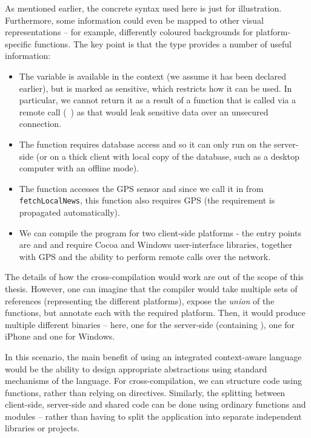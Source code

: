 As mentioned earlier, the concrete syntax used here is just for illustration. Furthermore,
some information could even be mapped to other visual representations -- for example, differently
coloured backgrounds for platform-specific functions. The key point is that the type provides a
number of useful information:

\begin{itemize}
\item The  variable is available in the context (we assume it has been declared 
  earlier), but is marked as sensitive, which restricts how it can be used. In particular, we 
  cannot return it as a result of a function that is called via a remote call (\eg~)
  as that would leak sensitive data over an unsecured connection.
   
\item The  function requires database access and so it can only run on the server-side
  (or on a thick client with local copy of the database, such as a desktop computer with an offline mode).

\item The  function accesses the GPS sensor and since we call it in 
  from \texttt{fetchLocalNews}, this function also requires GPS (the requirement is propagated 
  automatically).
  
\item We can compile the program for two client-side platforms - the entry points are 
  and  and require Cocoa and Windows user-interface libraries, together with
  GPS and the ability to perform remote calls over the network.
\end{itemize}

The details of how the cross-compilation would work are out of the scope of this thesis. However,
one can imagine that the compiler would take multiple sets of references (representing the different 
platforms), expose the \emph{union} of the functions, but annotate each with the required platform.
Then, it would produce multiple different binaries -- here, one for the server-side (containing
), one for iPhone and one for Windows.

In this scenario, the main benefit of using an integrated context-aware language would be the 
ability to design appropriate abstractions using standard mechanisms of the language. For 
cross-compilation, we can structure code using functions, rather than relying on 
directives. Similarly, the splitting between client-side, server-side and shared code can be
done using ordinary functions and modules -- rather than having to split the application into 
separate independent libraries or projects.

